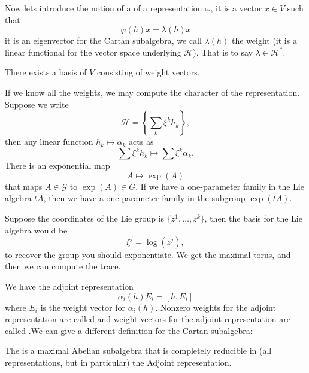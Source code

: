 Now lets introduce the notion of a  of a
representation $\varphi$, it is a vector $x\in V$ such that
\begin{equation}
\varphi(h)x=\lambda(h)x
\end{equation}
it is an eigenvector for the Cartan subalgebra, we call
$\lambda(h)$ the weight (it is a linear functional for the vector
space underlying $\mathscr{H}$). That is to say
$\lambda\in\mathscr{H}^{*}$. 

\begin{prop}
There exists a basis of $V$ consisting of weight vectors.
\end{prop}

If we know all the weights, we may compute the character of the
representation. Suppose we write
\begin{equation}
\mathscr{H}=\left\{\sum_{k}\xi^{k}h_{k}\right\},
\end{equation}
then any linear function $h_{k}\mapsto\alpha_{k}$ acts as
\begin{equation}
\sum \xi^{k}h_{k}\mapsto \sum\xi^{k}\alpha_{k}.
\end{equation}
There is an exponential map
\begin{equation}
A\mapsto\exp(A)
\end{equation}
that maps $A\in\mathscr{G}$ to $\exp(A)\in G$. If we have a
one-parameter family in the Lie algebra $tA$, then we have a
one-parameter family in the subgroup $\exp(tA)$.

Suppose the coordinates of the Lie group is
$\{z^{1},\dots,z^{k}\}$, then the basis for the Lie algebra
would be
\begin{equation}
\xi^{j}=\log(z^{j}),
\end{equation}
to recover the group you should exponentiate. We get the maximal
torus, and then we can compute the trace.

We have the adjoint representation
\begin{equation}
\alpha_{i}(h)E_{i} = [h,E_{i}]
\end{equation}
where $E_{i}$ is the weight vector for $\alpha_{i}(h)$. Nonzero
weights for the adjoint representation are called 
and weight vectors for the adjoint representation are
called .We can give a
different definition for the Cartan subalgebra:
\begin{defn}
The  is a maximal Abelian subalgebra
that is completely reducible in (all representations, but in
particular) the Adjoint representation.
\end{defn}

